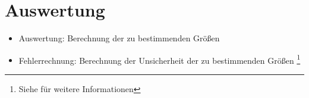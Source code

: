\section{Auswertung}
\label{sec:Auswertung}

\begin{itemize}
    \item Auswertung: Berechnung der zu bestimmenden Größen
    \item Fehlerrechnung: Berechnung der Unsicherheit der zu bestimmenden Größen \footnote{Siehe \cite{Praktikumsunterlagen} für weitere Informationen}
\end{itemize}